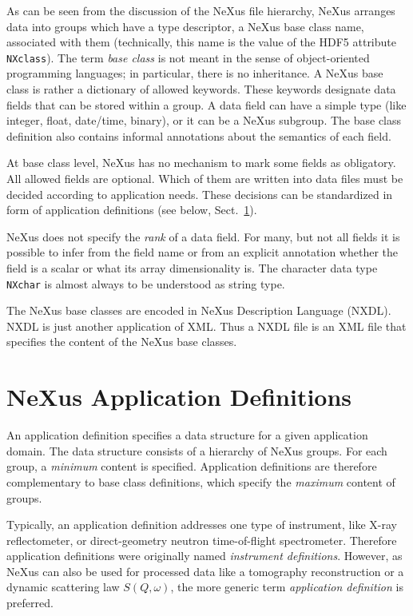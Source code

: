\documentclass[%
 aip,
rsi,
 amsmath,amssymb,
 reprint,%
]{revtex4-1}
\begin{document}
As can be seen from the discussion of the NeXus file hierarchy, NeXus arranges data into groups which have a 
type descriptor, a NeXus base class name, associated with them
(technically, this name is the value of the HDF5 attribute \texttt{NXclass}).
The term \emph{base class} is not meant in the sense of 
object-oriented programming languages;
in particular, there is no inheritance.
A NeXus base class is rather a dictionary of allowed keywords.
These keywords designate data fields that can be stored within a group.
A data field can have a simple type (like integer, float, date/time, binary),
or it can be a NeXus subgroup.
The base class definition also contains informal annotations
about the semantics of each field.

At base class level, NeXus has no mechanism to mark some fields as obligatory.
All allowed fields are optional.
Which of them are written into data files must be decided
according to application needs.
These decisions can be standardized in form of
application definitions (see below, Sect.~\ref{sect_appdef}).

NeXus does not specify the \emph{rank} of a data field.
For many, but not all fields it is possible to infer from
the field name or from an explicit annotation
whether the field is a scalar or what its array dimensionality is.
The character data type \texttt{NXchar} is almost always to be
understood as string type.

The NeXus base classes are encoded in NeXus Description Language (NXDL)\cite{nxman}. NXDL is 
just another application of XML. Thus a NXDL file is an XML file that specifies the content of the NeXus base classes. 


\section{NeXus Application Definitions}
  \label{sect_appdef}

An application definition specifies a data structure
for a given application domain.
The data structure consists of a hierarchy of NeXus groups.
For each group, a \emph{minimum} content is specified.
Application definitions are therefore complementary
to base class definitions, which specify the \emph{maximum} content of groups.

Typically, an application definition addresses one type of instrument,
like X-ray reflectometer,
or direct-geometry neutron time-of-flight spectrometer.
Therefore application definitions were originally named \emph{instrument definitions}.
However, as NeXus can also be used for processed data
like a tomography reconstruction or a dynamic scattering law $S(Q,\omega)$, 
the more generic term \emph{application definition} is preferred.
\end{document}
